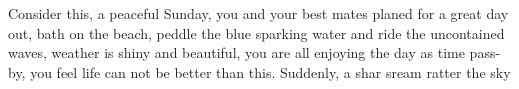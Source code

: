 Consider this, a peaceful Sunday, you and your best mates planed for a great day out, bath on the beach, peddle the blue sparking water and ride the uncontained waves, weather is shiny and beautiful, you are all enjoying the day as time pass-by, you feel life can not be better than this. Suddenly, a shar sream ratter the sky